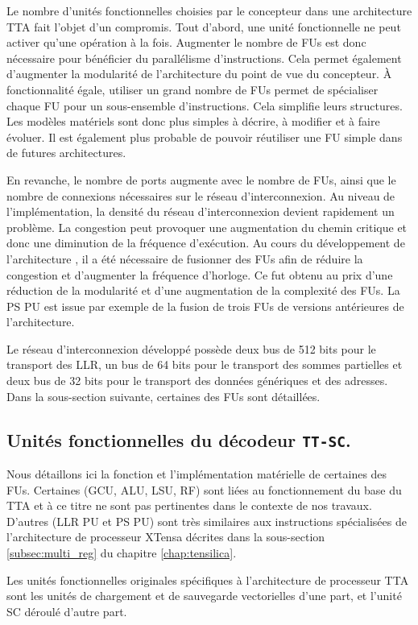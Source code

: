Le nombre d'unités fonctionnelles choisies par le concepteur dans une architecture TTA fait l'objet d'un compromis.
Tout d'abord, une unité fonctionnelle ne peut activer qu'une opération à la fois.
Augmenter le nombre de FUs est donc nécessaire pour bénéficier du parallélisme d'instructions.
Cela permet également d'augmenter la modularité de l'architecture du point de vue du concepteur.
\`A fonctionnalité égale, utiliser un grand nombre de FUs permet de spécialiser chaque FU pour un sous-ensemble d'instructions. Cela simplifie leurs structures. Les modèles matériels sont donc plus simples à décrire, à modifier et à faire évoluer. Il est également plus probable de pouvoir réutiliser une FU simple dans de futures architectures.

En revanche, le nombre de ports augmente avec le nombre de FUs, ainsi que le nombre de connexions nécessaires sur le réseau d'interconnexion.
Au niveau de l'implémentation, la densité du réseau d'interconnexion devient rapidement un problème. 
La congestion peut provoquer une augmentation du chemin critique et donc une diminution de la fréquence d'exécution. 
Au cours du développement de l'architecture \TTSC, il a été nécessaire de fusionner des FUs afin de réduire la congestion et d'augmenter la fréquence d'horloge. Ce fut obtenu au prix d'une réduction de la modularité et d'une augmentation de la complexité des FUs. La PS PU est issue par exemple de la fusion de trois FUs de versions antérieures de l'architecture.

Le réseau d'interconnexion développé possède deux bus de 512 bits pour le transport des LLR, un bus de 64 bits pour le transport des sommes partielles et deux bus de 32 bits pour le transport des données génériques et des adresses.
Dans la sous-section suivante, certaines des FUs sont détaillées.

\subsection{Unités fonctionnelles du décodeur \texttt{TT-SC}.}
Nous détaillons ici la fonction et l'implémentation matérielle de certaines des FUs. Certaines (GCU, ALU, LSU, RF) sont liées au fonctionnement du base du TTA et à ce titre ne sont pas pertinentes dans le contexte de nos travaux. D'autres (LLR PU et PS PU) sont très similaires aux instructions spécialisées de l'architecture de processeur XTensa décrites dans la sous-section \ref{subsec:multi_reg} du chapitre \ref{chap:tensilica}.

Les unités fonctionnelles originales spécifiques à l'architecture de processeur TTA sont les unités de chargement et de sauvegarde vectorielles d'une part, et l'unité \og SC déroulé \fg d'autre part.

